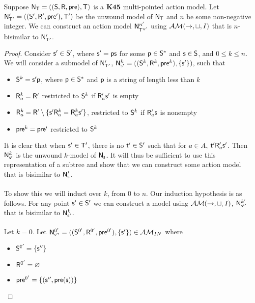 \begin{lemma} \label{lemma:unwoundModelBisimilarConstruct}
  Suppose $\evM_\evT = ((\evS,\evR,\evpr),\evT)$ is a $\AXKFF$ multi-pointed
  action model.
	Let $\evM'_{\evT'} = ((\evS',\evR',\evpr'),\evT')$ be the unwound model of
  $\evM_\evT$ and $n$ be some non-negative integer.
	We can construct an action model $\evM^{n'}_{\evT^{n'}}$ using $\EM(\to,\sqcup,I)$ that is $n$-bisimilar to
  $\evM'_{\evT'}$.
\end{lemma}
\begin{proof}
	Consider $\evs' \in \evS'$, where $\evs' = \evp \evs$ for some $\evp \in \evS^\ast$ and $\evs \in
	\evS$, and $0 \leq k \leq n$.
	We will consider a submodel of $\evM'_{\evT'}$, $\evM^k_{\evs'} =
	((\evS^k,\evR^k,\evpr^k),\{\evs'\})$, such that
	\begin{itemize}
		\item $\evS^k = \evs' \evp$, where $\evp \in \evS^\ast$ and $\evp$ is a string of length less
			than $k$
		\item $\evR^k_a = \evR'$ restricted to $\evS^k$ if $\evR'_a \evs'$ is empty
		\item $\evR^k_a = \evR' \setminus \{\evs' \evR^k_a = \evR^k_a \evs'\}$,
    restricted to $\evS^k$ if $\evR'_a \evs$ is nonempty
		\item $\evpr^k = \evpr'$ restricted to $\evS^k$
	\end{itemize}

	It is clear that when $\evs' \in \evT'$, there is no $\evt' \in \evS'$ such
  that for $a \in A$, $\evt' \evR'_a \evs'$.
  Then $\evM^k_{\evs'}$ is the unwound $k$-model of $\evM_\evs$.
	It will thus be sufficient to use this representation of a subtree and show that we can construct
	some action model that is bisimilar to $\evM'_\evs$.\\
	\\
	To show this we will induct over $k$, from 0 to $n$.
	Our induction hypothesis is as follows.
  For any point $\evs' \in \evS'$ we can construct a model using
  $\EM(\to,\sqcup,I)$, $\evM^{k'}_{\evs''}$ that is bisimilar to $\evM^k_{\evs'}$.\\
	\\
	Let $k = 0$.
	Let $\evM^{0'}_{\evs''} = ((\evS^{0'},\evR^{0'},\evpr^{0'}),\{\evs'\}) \in \insaneClass$ where
	\begin{itemize}
		\item $\evS^{0'} = \{\evs''\}$
		\item $\evR^{0'} = \varnothing$
		\item $\evpr^{0'} = \{(\evs'',\evpr(\evs))\}$
	\end{itemize}


\end{proof}
